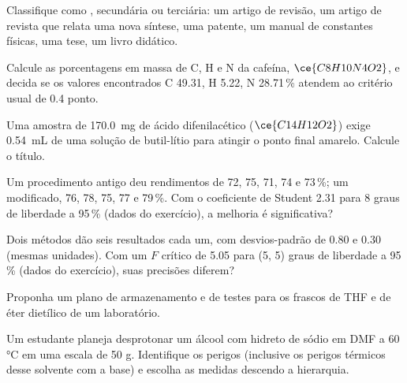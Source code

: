 \begin{exercise}[$\star$]\label{exo:b3:lab-techniques-3:4}
Classifique como , secundária ou terciária: um artigo de revisão, um
artigo de revista que relata uma nova síntese, uma patente, um manual de constantes
físicas, uma tese, um livro didático.
\end{exercise}

\begin{exercise}[$\star\star$]\label{exo:b3:lab-techniques-3:5}
Calcule as porcentagens em massa de C, H e N da cafeína, $\ce{C8H10N4O2}$, e decida se os valores
encontrados C 49.31, H 5.22, N 28.71\,\% atendem ao critério usual de 0.4 ponto.
\end{exercise}

\begin{exercise}[$\star\star$]\label{exo:b3:lab-techniques-3:6}
Uma amostra de \qty{170.0}{mg} de ácido difenilacético ($\ce{C14H12O2}$) exige \qty{0.54}{mL} de uma solução de butil-lítio para atingir
o ponto final amarelo. Calcule o título.
\end{exercise}

\begin{exercise}[$\star\star$]\label{exo:b3:lab-techniques-3:7}
Um procedimento antigo deu rendimentos de 72, 75, 71, 74 e 73\,\%; um modificado, 76, 78, 75, 77 e
79\,\%. Com o coeficiente de Student 2.31 para 8 graus de liberdade a 95\,\% (dados do exercício),
a melhoria é significativa?
\end{exercise}

\begin{exercise}[$\star\star$]\label{exo:b3:lab-techniques-3:8}
Dois métodos dão seis resultados cada um, com desvios-padrão de 0.80 e 0.30 (mesmas
unidades). Com um $F$ crítico de 5.05 para (5, 5) graus de liberdade a 95\,\% (dados do
exercício), suas precisões diferem?
\end{exercise}

\begin{exercise}[$\star\star$]\label{exo:b3:lab-techniques-3:9}
Proponha um plano de armazenamento e de testes para os frascos de THF e de éter dietílico
de um laboratório.
\end{exercise}

\begin{exercise}[$\star\star\star$]\label{exo:b3:lab-techniques-3:10}
Um estudante planeja desprotonar um álcool com hidreto de sódio em DMF a 60 °C em uma
escala de 50 g. Identifique os perigos (inclusive os perigos térmicos desse solvente com
a base) e escolha as medidas descendo a hierarquia.
\end{exercise}

